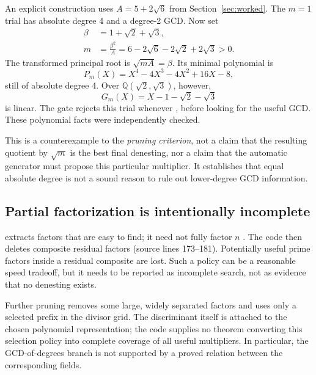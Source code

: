 \documentclass[11pt,letterpaper]{article}
\newcommand{\code}[1]{\texttt{\detokenize{#1}}}
\newcommand{\src}[1]{\textnormal{(source lines #1)}}
\newcommand{\Q}{\mathbb{Q}}
\theoremstyle{definition}
\begin{document}
An explicit construction uses $A=5+2\sqrt6$ from Section~\ref{sec:worked}. The
$m=1$ trial has absolute degree 4 and a degree-2 GCD. Now set
\begin{align}
 \beta&=1+\sqrt2+\sqrt3,\\
 m&=\frac{\beta^2}{A}
   =6-2\sqrt6-2\sqrt2+2\sqrt3>0.
\end{align}
The transformed principal root is $\sqrt{mA}=\beta$. Its minimal polynomial is
\begin{equation}
 P_m(X)=X^4-4X^3-4X^2+16X-8,
\end{equation}
still of absolute degree 4. Over $\Q(\sqrt2,\sqrt3)$, however,
\begin{equation}
 G_m(X)=X-1-\sqrt2-\sqrt3
\end{equation}
is linear. The gate rejects this trial whenever \code{best == 4}, before looking
for the useful GCD. These polynomial facts were independently checked.

This is a counterexample to the \emph{pruning criterion}, not a claim that the
resulting quotient by $\sqrt m$ is the best final denesting, nor a claim that the
automatic generator must propose this particular multiplier. It establishes that
equal absolute degree is not a sound reason to rule out lower-degree GCD information.

\subsection{Partial factorization is intentionally incomplete}
\code{FactorInteger[n, Automatic]} extracts factors that are easy to find; it need
not fully factor $n$ \cite{factorinteger}. The code then deletes composite residual
factors \src{173--181}. Potentially useful prime factors inside a residual composite
are lost. Such a policy can be a reasonable speed tradeoff, but it needs to be
reported as incomplete search, not as evidence that no denesting exists.

Further pruning removes some large, widely separated factors and uses only a
selected prefix in the divisor grid. The discriminant itself is attached to the
chosen polynomial representation; the code supplies no theorem converting this
selection policy into complete coverage of all useful multipliers. In particular,
the GCD-of-degrees branch is not supported by a proved relation between the
corresponding fields.
\end{document}
